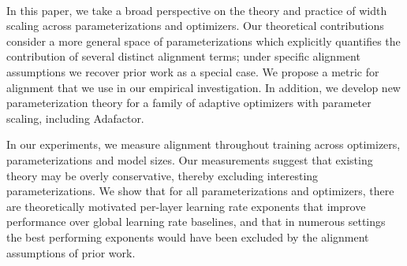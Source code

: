 \documentclass{article}
\theoremstyle{plain}
\theoremstyle{definition}
\theoremstyle{remark}
\begin{document}
\begin{table}
\begin{footnotesize}
{\begin{tabular}
        \\ 
        \hline
    \end{tabular}
    }
    \caption{\textbf{Summary of parameterizations, their gradients and the learning rates derived in \cref{sec:theory}.} Left: Parameterizations and gradients at initialization for width $n$. Middle: Max stable per-layer learning rate scaling for each optimizer assuming ``full alignment" where $\alpha_l = u_l = 1, \omega_l = 1/2$ for all layers $l$. Right: Max stable learning rates assuming ``no alignment" where $\alpha_l = \omega_l = u_l = 1/2$ for all layers.}
    \label{tab:common_parameterizations}
    \end{footnotesize}
\end{table}
















In this paper, we take a broad perspective on the theory and practice of width scaling across parameterizations and optimizers. Our theoretical contributions consider a more general space of parameterizations which explicitly quantifies the contribution of several distinct alignment terms; under specific alignment assumptions we recover prior work as a special case. We propose a metric for alignment that we use in our empirical investigation. In addition, we develop new parameterization theory for a family of adaptive optimizers with parameter scaling, including Adafactor.

In our experiments, we measure alignment throughout training across optimizers, parameterizations and model sizes. Our measurements suggest that existing theory may be overly conservative, thereby excluding interesting parameterizations. We show that for all parameterizations and optimizers, there are theoretically motivated per-layer learning rate exponents that improve performance over global learning rate baselines, and that in numerous settings the best performing exponents would have been excluded by the alignment assumptions of prior work.
\end{document}
